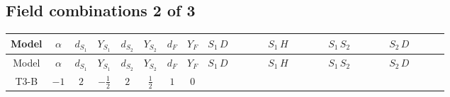 \documentclass[8pt]{article}
\begin{document}
\begin{landscape}
\subsection*{Field combinations 2 of 3}
\begin{longtable}{@{}cccccccc >{\raggedright\arraybackslash}p{0.18\linewidth} >{\raggedright\arraybackslash}p{0.18\linewidth} >{\raggedright\arraybackslash}p{0.18\linewidth} >{\raggedright\arraybackslash}p{0.18\linewidth}@{}}
\toprule
Model & $\alpha$ & $d_{S_1}$ & $Y_{S_1}$ & $d_{S_2}$ & $Y_{S_2}$ & $d_F$ & $Y_F$ & $S_1\,D$ & $S_1\,H$ & $S_1\,S_2$ & $S_2\,D$ \\
\midrule
\endfirsthead
\toprule
Model & $\alpha$ & $d_{S_1}$ & $Y_{S_1}$ & $d_{S_2}$ & $Y_{S_2}$ & $d_F$ & $Y_F$ & $S_1\,D$ & $S_1\,H$ & $S_1\,S_2$ & $S_2\,D$ \\
\midrule
\endhead
T3-B & $-1$ & $2$ & $-\frac{1}{2}$ & $2$ & $\frac{1}{2}$ & $1$ & $0$ & \scriptsize\adjustbox{max width=\linewidth}{$\begin{gathered} +D_{\mu _1}\left(\text{NewScalar1}_{j_1}\right){}^{\dagger } D_{\mu _1}\left(\text{NewScalar1}_{j_1}\right)\end{gathered}$} & \scriptsize\adjustbox{max width=\linewidth}{$\begin{gathered} +\text{lambdaH1Inv1} H_{a_2} \text{NewScalar1}_{j_2} \text{T3HiggsPortal1CGInv1}_{a_1,a_2,j_1,j_2} H_{a_1}{}^{\dagger } \text{NewScalar1}_{j_1}{}^{\dagger } \\ +\text{lambdaH1Inv2} H_{a_2} \text{NewScalar1}_{j_2} \text{T3HiggsPortal1CGInv2}_{a_1,a_2,j_1,j_2} H_{a_1}{}^{\dagger } \text{NewScalar1}_{j_1}{}^{\dagger }\end{gathered}$} & \scriptsize\adjustbox{max width=\linewidth}{$\begin{gathered} +\text{lambda12Inv1} \text{NewScalar1}_{j_3} \text{NewScalar2}_{j_4} \text{T3CrossScalarCGInv1}_{j_1,j_3,j_2,j_4} \text{NewScalar1}_{j_1}{}^{\dagger } \text{NewScalar2}_{j_2}{}^{\dagger } \\ +\text{lambda12Inv2} \text{NewScalar1}_{j_3} \text{NewScalar2}_{j_4} \text{T3CrossScalarCGInv2}_{j_1,j_3,j_2,j_4} \text{NewScalar1}_{j_1}{}^{\dagger } \text{NewScalar2}_{j_2}{}^{\dagger }\end{gathered}$} & \scriptsize\adjustbox{max width=\linewidth}{$\begin{gathered} +D_{\mu _1}\left(\text{NewScalar2}_{j_1}\right){}^{\dagger } D_{\mu _1}\left(\text{NewScalar2}_{j_1}\right)\end{gathered}$} \\

\end{longtable}
\end{landscape}
\end{document}
